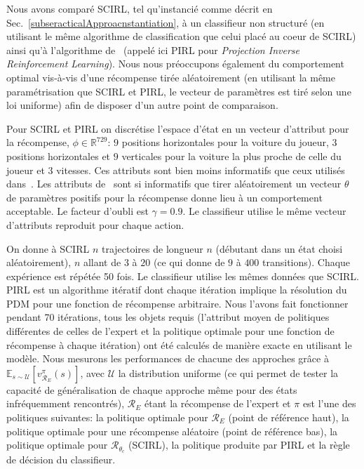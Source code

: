 \documentclass[french,utf8]{./hermes-journal}
\newcommand{\R}{\mathcal{R}}
\newcommand{\E}{\mathbb{E}}
\begin{document}
Nous avons comparé SCIRL, tel qu'instancié comme décrit en
Sec.~\ref{subseracticalApproacnstantiation}, à un classifieur non structuré (en utilisant le même algorithme de classification que celui placé au coeur de SCIRL) ainsi qu'à l'algorithme de~\cite{Abbee004} (appelé ici PIRL pour \emph{
Projection Inverse Reinforcement Learning}). Nous nous préoccupons également du comportement optimal vis-à-vis d'une récompense tirée aléatoirement (en utilisant la même paramétrisation que SCIRL et PIRL, le vecteur de paramètres est tiré selon une loi uniforme) afin de disposer d'un autre point de comparaison.

Pour SCIRL et PIRL on discrétise l'espace d'état en un vecteur d'attribut pour la récompense, $\phi\in\mathbb{R}^{729}$: $9$ positions horizontales pour la voiture du joueur, $3$ positions horizontales et $9$ verticales pour la voiture la plus proche de celle du joueur et $3$ vitesses. Ces attributs sont bien moins informatifs que ceux utilisés dans~\cite{Abbee004,Sye00ame}. Les attributs de~\cite{Sye00ame} sont si informatifs que tirer aléatoirement un vecteur $\theta$ de paramètres positifs pour la récompense donne lieu à un comportement acceptable. Le facteur d'oubli est $\gamma = 0.9$. Le classifieur utilise le même vecteur d'attributs reproduit pour chaque action.

On donne à SCIRL $n$ trajectoires de longueur $n$ (débutant dans un état choisi aléatoirement), $n$ allant de  $3$ à $20$ (ce qui donne de $9$ à
$400$ transitions). Chaque expérience est répétée 50 fois. Le classifieur utilise les mêmes données que SCIRL. PIRL est un algorithme itératif dont chaque itération implique la résolution du PDM pour une fonction de récompense arbitraire. Nous l'avons fait fonctionner pendant 70 itérations, tous les objets requis (l'attribut moyen de politiques différentes de celles de l'expert et la politique optimale pour une fonction de récompense à chaque itération) ont été calculés de manière exacte en utilisant le modèle. Nous mesurons les performances de chacune des approches grâce à $\E_{s\sim \mathcal{U}}[v^\pi_{\R_E}(s)]$, avec $\mathcal{U}$
la distribution uniforme (ce qui permet de tester la capacité de généralisation de chaque approche même pour des états infréquemment rencontrés), $\R_E$ étant la récompense de l'expert et $\pi$ est l'une des politiques suivantes: la politique optimale pour $\R_E$ (point de référence haut),
la politique optimale pour une récompense aléatoire (point de référence bas), la politique optimale pour $\R_{\theta_c}$ (SCIRL), la politique produite par PIRL et la règle de décision du classifieur.
\end{document}
